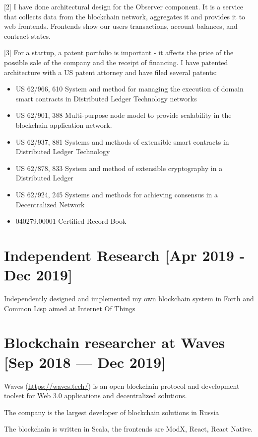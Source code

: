 \documentclass[11pt]{article}
\begin{document}
[2] I have done architectural design for the Observer
component. It is a service that collects data from the
blockchain network, aggregates it and provides it to web
frontends. Frontends show our users transactions, account
balances, and contract states.

[3] For a startup, a patent portfolio is important - it
affects the price of the possible sale of the company and
the receipt of financing. I have patented architecture with
a US patent attorney and have filed several patents:
\begin{itemize}
\item US 62/966, 610 System and method for managing the
execution of domain smart contracts in Distributed
Ledger Technology networks
\item US 62/901, 388 Multi-purpose node model to provide
scalability in the blockchain application network.
\item US 62/937, 881 Systems and methods of extensible smart
contracts in Distributed Ledger Technology
\item US 62/878, 833 System and method of extensible
cryptography in a Distributed Ledger
\item US 62/924, 245 Systems and methods for achieving
consensus in a Decentralized Network
\item 040279.00001 Certified Record Book
\end{itemize}

\section{\textbf{Independent Research} [Apr 2019 - Dec 2019]}
\label{sec:org65558a3}

Independently designed and implemented my own blockchain
system in Forth and Common Lisp aimed at Internet Of Things

\section{\textbf{Blockchain researcher} at \textbf{Waves} [Sep 2018 — Dec 2019]}
\label{sec:org8081b0e}

Waves (\url{https://waves.tech/}) is an open blockchain protocol
and development toolset for Web 3.0 applications and
decentralized solutions.

The company is the largest developer of blockchain solutions
in Russia

The blockchain is written in Scala, the frontends are ModX,
React, React Native.
\end{document}
